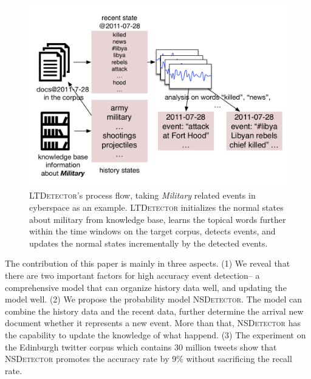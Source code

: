 \documentclass{article}
\begin{document}

\begin{figure}[h]
    \centering
    \includegraphics[width=.82\columnwidth]{img/NSDetectorExample.pdf}
    \caption{\textsc{LTDetector}'s process flow, taking \textit{Military} related events in cyberspace as an example. \textsc{LTDetector} initializes the normal states about military from knowledge base, learns the topical words further within the time windows on the target corpus, detects events, and updates the normal states incrementally by the detected events.}
    \label{fig:modelDesc}
\end{figure}


The contribution of this paper is mainly in three aspects.
(1) We reveal that there are two important factors for high accuracy event detection-- a comprehensive model that can organize history data well, and updating the model well.
(2) We propose the probability model \textsc{NSDetector}. 
The model can combine the history data and the recent data, further determine the arrival new document whether it represents a new event. 
More than that, \textsc{NSDetector} has the capability to update the knowledge of what happend.
(3) The experiment on the Edinburgh twitter corpus which contains 30 million tweets show that \textsc{NSDetector} promotes the accuracy rate by 9\% without sacrificing the recall rate.
\end{document}
